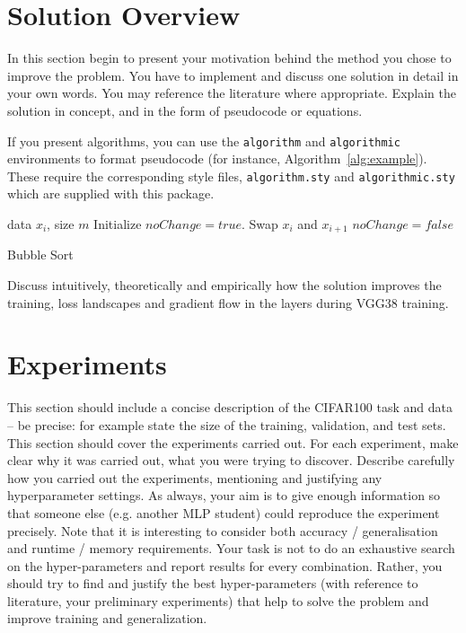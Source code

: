 \documentclass{article}
\begin{document}
\section{Solution Overview}

In this section begin to present your motivation behind the method you chose to improve the problem. You have to implement and discuss one solution in detail in your own words. You may reference the literature where appropriate. Explain the solution in concept, and in the form of pseudocode or equations. 

If you present algorithms, you can use the \verb+algorithm+ and \verb+algorithmic+ environments to format pseudocode (for instance, Algorithm~\ref{alg:example}). These require the corresponding style files, \verb+algorithm.sty+ and \verb+algorithmic.sty+ which are supplied with this package. 


\begin{algorithm}[ht]
\begin{algorithmic}
    data $x_i$, size $m$
   \REPEAT
   \STATE Initialize $noChange = true$.
   \STATE Swap $x_i$ and $x_{i+1}$
   \STATE $noChange = false$
   \ENDIF
   \ENDFOR
\end{algorithmic}
  \caption{Bubble Sort}
  \label{alg:example}
\end{algorithm}


Discuss intuitively, theoretically and empirically how the solution improves the training, loss landscapes and gradient flow in the layers during VGG38 training.




\section{Experiments}
This section should include a concise description of the CIFAR100 task and  data -- be precise: for example state the size of the training, validation, and test sets.  
This section should cover the experiments carried out. For each experiment, make clear why it was carried out, what you were trying to discover. Describe carefully how you carried out the experiments, mentioning and justifying any hyperparameter settings.  As always, your aim is to give enough information so that someone else (e.g. another MLP student) could reproduce the experiment precisely.  Note that it is interesting to consider both accuracy / generalisation and runtime / memory requirements. Your task is not to do an exhaustive search on the hyper-parameters and report results for every combination. Rather, you should try to find and justify the best hyper-parameters (with reference to literature, your preliminary experiments) that help to solve the problem and improve training and generalization. 
\end{document}
